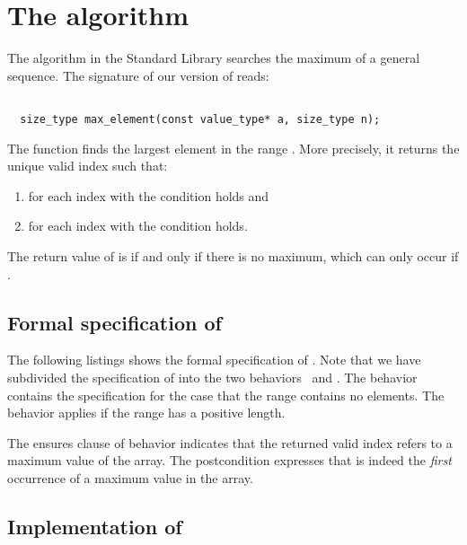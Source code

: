 
\section{The \maxelement algorithm}

The \maxelement algorithm in the \cxx Standard Library \cite[\S 28.7.8]{cxx-17-draft}
searches the maximum of a general sequence. 
The signature of our version of \maxelement reads:

\begin{lstlisting}[style = acsl-block]

  size_type max_element(const value_type* a, size_type n);
\end{lstlisting}

The function finds the largest element in the range
.
More precisely, it returns the unique valid index  such that:
\begin{enumerate}
\item for each index  with  the condition
 holds and
\item for each index  with  the condition
 holds.
\end{enumerate}
The return value of \maxelement is  if and only if there is no
maximum, which can only occur if .

\subsection{Formal specification of \maxelement}

The following listings shows the formal specification of .
Note that we have subdivided the specification of \maxelement into the two
behaviors~ and .
The behavior  contains the specification for the case that the
range contains no elements.
The behavior  applies if the range has a positive length.

The ensures clause  of behavior  indicates that
the returned valid index  refers to a maximum value of the array.
The postcondition  expresses that  is indeed the
\emph{first} occurrence of a maximum value in the array.



\subsection{Implementation of \maxelement}

